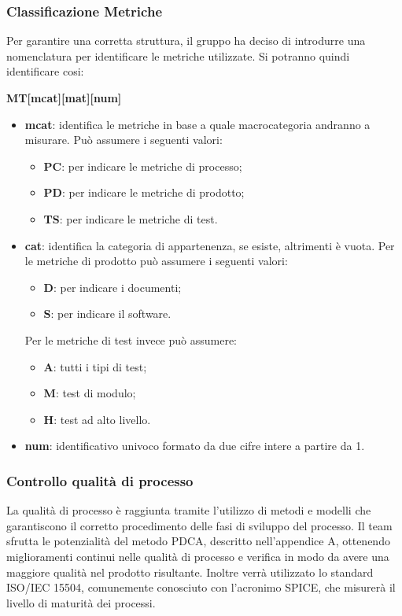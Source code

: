 \subsubsection{Classificazione Metriche}
Per garantire una corretta struttura, il gruppo ha deciso di introdurre una nomenclatura per identificare le metriche utilizzate. Si potranno quindi identificare cosi:
\begin{center}
	\textbf{MT[mcat][mat][num]}
\end{center}
\begin{itemize}
		\item \textbf{mcat}: identifica le metriche in base a quale macrocategoria andranno a misurare. Può assumere i seguenti valori:
	\begin{itemize}
		\item \textbf{PC}: per indicare le metriche di processo;
		\item \textbf{PD}: per indicare le metriche di prodotto;
		\item \textbf{TS}: per indicare le metriche di test.
	\end{itemize}
	\item \textbf{cat}: identifica la categoria di appartenenza, se esiste, altrimenti è vuota. Per le metriche di prodotto può assumere i seguenti valori:
	\begin{itemize}
		\item \textbf{D}: per indicare i documenti;
		\item \textbf{S}: per indicare il software.
	\end{itemize}
	Per le metriche di test invece può assumere:
	\begin{itemize}
		\item \textbf{A}: tutti i tipi di test;
		\item \textbf{M}: test di modulo;
		\item \textbf{H}: test ad alto livello.
	\end{itemize}
	\item \textbf{num}: identificativo univoco formato da due cifre intere a partire da 1.
\end{itemize}

\subsubsection{Controllo qualità di processo}
La qualità di processo è raggiunta tramite l'utilizzo di metodi e modelli che garantiscono il corretto procedimento delle fasi di sviluppo del processo. Il team sfrutta le potenzialità del metodo PDCA, descritto nell'appendice A, ottenendo miglioramenti continui nelle qualità di processo e verifica in modo da avere una maggiore qualità nel prodotto risultante. Inoltre verrà utilizzato lo standard ISO/IEC 15504, comunemente conosciuto con l'acronimo SPICE, che misurerà il livello di maturità dei processi.

